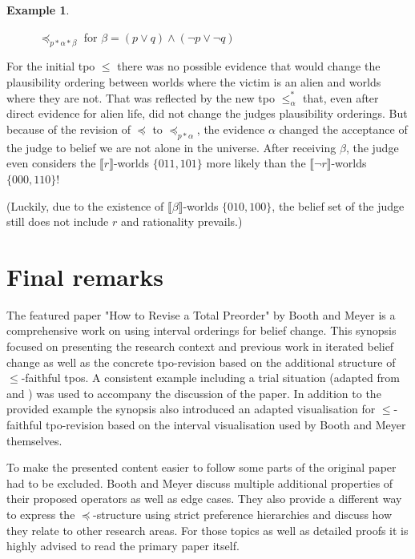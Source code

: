 \documentclass[english, 12pt]{scrartcl}
\theoremstyle{definition}
\newtheorem{example}{Example}
\theoremstyle{definition}
\theoremstyle{definition}
\newcommand{\modelsOf}[1]{\llbracket #1 \rrbracket}
\begin{document}
\begin{example}
\begin{figure}[H]
            \caption{$\preceq_{p \ast \alpha \ast \beta}$ for $\beta = (p \vee q) \wedge (\neg p \vee \neg q)$}
            \label{fig:example-preceq-revised-alien2}
    \end{figure}
    
For the initial tpo $\leq$ there was no possible evidence that would change the plausibility ordering between worlds where the victim is an alien and worlds where they are not. That was reflected by the new tpo $\leq_{\alpha}^{\ast}$ that, even after direct evidence for alien life, did not change the judges plausibility orderings. But because of the revision of $\preceq$ to $\preceq_{p \ast \alpha}$, the evidence $\alpha$ changed the acceptance of the judge to belief we are not alone in the universe. After receiving $\beta$, the judge even considers the $\modelsOf{r}$-worlds $\{011, 101\}$ more likely than the $\modelsOf{\neg r}$-worlds $\{000, 110\}$!

(Luckily, due to the existence of $\modelsOf{\beta}$-worlds $\{010, 100\}$, the belief set of the judge still does not include $r$ and rationality prevails.)
\end{example}

\section{Final remarks}
\label{section:conclusion}
The featured paper "How to Revise a Total Preorder" by Booth and Meyer \cite{Booth2011} is a comprehensive work on using interval orderings for belief change. This synopsis focused on presenting the research context and previous work in iterated belief change as well as the concrete tpo-revision based on the additional structure of $\leq$-faithful tpos. A consistent example including a trial situation (adapted from \cite{Darwiche1997} and \cite{Booth2011}) was used to accompany the discussion of the paper. In addition to the provided example the synopsis also introduced an adapted visualisation for $\leq$-faithful tpo-revision based on the interval visualisation used by Booth and Meyer themselves.

To make the presented content easier to follow some parts of the original paper had to be excluded. Booth and Meyer discuss multiple additional properties of their proposed operators as well as edge cases. They also provide a different way to express the $\preceq$-structure using strict preference hierarchies and discuss how they relate to other research areas. For those topics as well as detailed proofs it is highly advised to read the primary paper \cite{Booth2011} itself.
\end{document}
